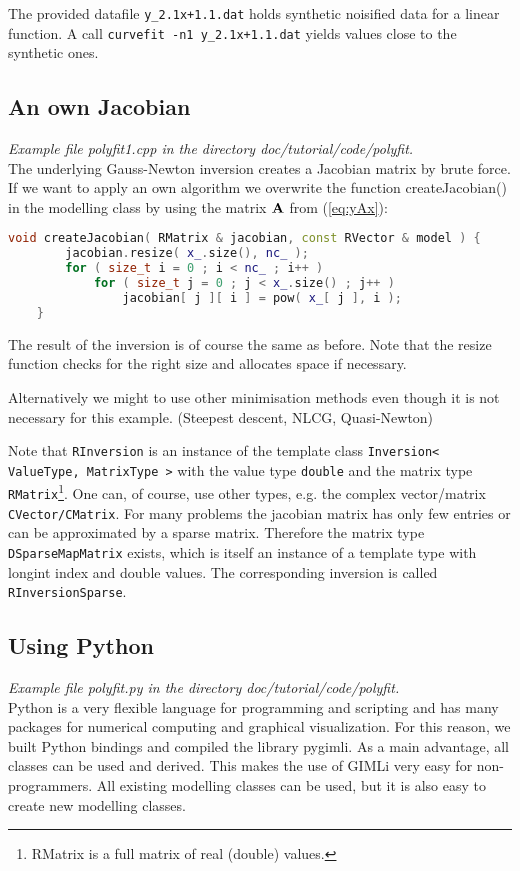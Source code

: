 The provided datafile \verb|y_2.1x+1.1.dat| holds synthetic noisified data for a linear function.
A call \verb|curvefit -n1 y_2.1x+1.1.dat| yields values close to the synthetic ones.

\subsection{An own Jacobian}
{\em Example file polyfit1.cpp in the directory doc/tutorial/code/polyfit.}\\
The underlying Gauss-Newton inversion creates a Jacobian matrix by brute force.
If we want to apply an own algorithm we overwrite the function createJacobian() in the modelling class by using the matrix $\mathbf{A}$ from (\ref{eq:yAx}):
\begin{lstlisting}[language=C++]
    void createJacobian( RMatrix & jacobian, const RVector & model ) {
        jacobian.resize( x_.size(), nc_ );
        for ( size_t i = 0 ; i < nc_ ; i++ )
            for ( size_t j = 0 ; j < x_.size() ; j++ )
                jacobian[ j ][ i ] = pow( x_[ j ], i );
    }
\end{lstlisting}

The result of the inversion is of course the same as before.
Note that the resize function checks for the right size and allocates space if necessary.

Alternatively we might to use other minimisation methods even though it is not necessary for this example.
\sperre (Steepest descent, NLCG, Quasi-Newton)

Note that \lstinline|RInversion| is an instance of the template class \lstinline|Inversion< ValueType, MatrixType >| with the value type \lstinline|double| and the matrix type \lstinline|RMatrix|\footnote{RMatrix is a full matrix of real (double) values.}.
One can, of course, use other types, e.g. the complex vector/matrix \lstinline|CVector/CMatrix|. 
For many problems the jacobian matrix has only few entries or can be approximated by a sparse matrix.
Therefore the matrix type \lstinline|DSparseMapMatrix| exists, which is itself an instance of a template type with longint index and double values. %
The corresponding inversion is called \lstinline|RInversionSparse|.

\subsection{Using Python}
{\em Example file polyfit.py in the directory doc/tutorial/code/polyfit.}\\
Python is a very flexible language for programming and scripting and has many packages for numerical computing and graphical visualization.
For this reason, we built Python bindings and compiled the library pygimli.
As a main advantage, all classes can be used and derived.
This makes the use of GIMLi very easy for non-programmers.
All existing modelling classes can be used, but it is also easy to create new modelling classes.

